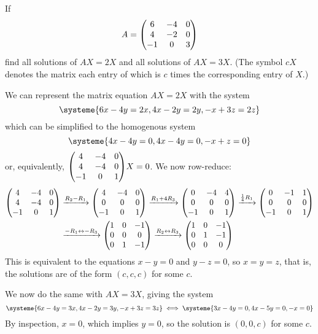 \begin{xca}
  If \[ A = \mqty(6&-4&0 \\ 4&-2&0 \\ -1&0&3) \]
  find all solutions of $AX = 2X$ and all solutions of $AX = 3X$.
  (The symbol $cX$ denotes the matrix each entry of which is $c$ times the corresponding entry of $X$.)
\end{xca}
\begin{sol}
  We can represent the matrix equation $AX = 2X$ with the system
  \[ \systeme{6x - 4y = 2x, 4x - 2y = 2y, -x + 3z = 2z} \]
  which can be simplified to the homogenous system
  \[ \systeme{4x - 4y = 0, 4x - 4y = 0, -x + z = 0} \]
  or, equivalently, $\mqty(4&-4&0 \\ 4&-4&0 \\ -1&0&1)X = 0$. We now row-reduce:
  \begin{equation*}
    \begin{split}
      \mqty(4&-4&0 \\ 4&-4&0 \\ -1&0&1)
      & \xto{R_2 - R_1} \mqty(4&-4&0 \\ 0&0&0 \\ -1&0&1)
      \xto{R_1 + 4R_3} \mqty(0&-4&4 \\ 0&0&0 \\ -1&0&1)
      \xto{\frac14 R_1} \mqty(0&-1&1 \\ 0&0&0 \\ -1&0&1) \\
      & \xto{-R_1 \harr -R_3} \mqty(1&0&-1 \\ 0&0&0 \\ 0&1&-1)
      \xto{R_2 \harr R_3} \mqty(1&0&-1 \\ 0&1&-1 \\ 0&0&0)
    \end{split}
  \end{equation*}
  This is equivalent to the equations $x - y = 0$ and $y - z = 0$, so $x = y = z$, that is,
  the solutions are of the form $(c,c,c)$ for some $c$.

  We now do the same with $AX = 3X$, giving the system
  \[
    \systeme{6x - 4y = 3x, 4x - 2y = 3y, -x + 3z = 3z}
    \iff
    \systeme{3x - 4y = 0, 4x - 5y = 0, -x = 0}
  \]
  By inspection, $x = 0$, which implies $y = 0$, so the solution is $(0,0,c)$ for some $c$.
\end{sol}

